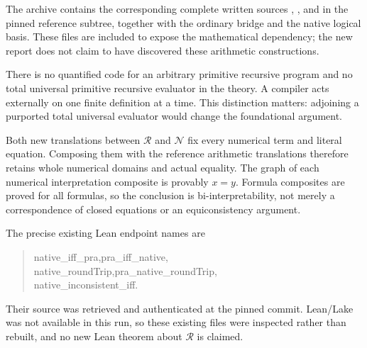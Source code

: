 \documentclass[11pt,a4paper]{article}
\theoremstyle{definition}\newtheorem{definition}[theorem]{Definition}
\begin{document}
The archive contains the corresponding complete written sources
, , and
 in the pinned reference subtree, together
with the ordinary bridge and the native logical basis. These files are
included to expose the mathematical dependency; the new report does
not claim to have discovered these arithmetic constructions.

There is no quantified code for an arbitrary primitive recursive
program and no total universal primitive recursive evaluator in the
theory. A compiler acts externally on one finite definition at a time.
This distinction matters: adjoining a purported total universal
evaluator would change the foundational argument.

Both new translations between $\mathcal R$ and $\mathcal N$ fix every
numerical term and literal equation. Composing them with the reference
arithmetic translations therefore retains whole numerical domains and
actual equality. The graph of each numerical interpretation composite
is provably $x=y$. Formula composites are proved for all formulas, so
the conclusion is bi-interpretability, not merely a correspondence of
closed equations or an equiconsistency argument.

The precise existing Lean endpoint names are
\begin{quote}\small\ttfamily
native\_iff\_pra,\quad pra\_iff\_native,\\
native\_roundTrip,\quad pra\_native\_roundTrip,\\
native\_inconsistent\_iff.
\end{quote}
Their source was retrieved and
authenticated at the pinned commit. Lean/Lake was not available in this
run, so these existing files were inspected rather than rebuilt, and no
new Lean theorem about $\mathcal R$ is claimed.

\end{document}
